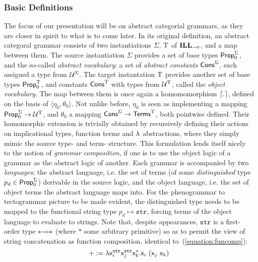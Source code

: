 \subsubsection{Basic Definitions}
The focus of our presentation will be on abstract categorial grammars, as they are closer in spirit to what is to come later.
In its original definition, an abstract categoral grammar consists of two instantiations $\Sigma$, $\mathrm{T}$ of $\ILL_{\li}$, and a map between them.
The source instantiation $\Sigma$ provides a set of base types $\mathsf{Prop}_0^{\Sigma}$, and the so-called \textit{abstract vocabulary}: a set of \textit{abstract constants} $\mathsf{Cons}^{\Sigma}$, each assigned a type from $\mathcal{U}^{\Sigma}$.
The target instantation $\mathrm{T}$ provides another set of base types $\mathsf{Prop}_0^{\mathrm{T}}$, and constants $\mathsf{Cons}^{\mathrm{T}}$ with types from $\mathcal{U}^{\mathrm{T}}$, called the \textit{object vocabulary}.
The map between them is once again a homomomorphism $\lceil{.}\rceil$, defined on the basis of $\langle \eta_0, \theta_0\rangle$.
Not unlike before, $\eta_0$ is seen as implementing a mapping $\mathsf{Prop}_0^{\Sigma} \to \mathcal{U}^{\mathrm{T}}$, and $\theta_0$ a mapping $\mathsf{Cons}^{\Sigma}\to \mathsf{Terms}^{\mathrm{T}}$, both pointwise defined.
Their homomorphic extension is trivially obtained by recursively defining their actions on implicational types, function terms and $\mathnormal{\lambda}$ abstractions, where they simply mimic the source type- and term- structure.
This formulation lends itself nicely to the notion of \textit{grammar composition}, if one is to use the object logic of a grammar as the abstract logic of another.
Each grammar is accompanied by two \textit{languages}; the abstract language, i.e. the set of terms (of some \textit{distinguished} type $p_d\in \mathsf{Prop}_0^{\Sigma}$) derivable in the source logic, and the object language, i.e. the set of object terms the abstract language maps into.
For the phenogrammar to tectogrammar picture to be made evident, the distinguished type needs to be mapped to the functional string type $p_{d} \mapsto \mathtt{str}$, forcing terms of the object language to evaluate to strings.
Note that, despite appearances, $\mathtt{str}$ is a first-order type $*\li *$ (where $*$ some arbitrary primitive) so as to permit the view of string concatenation as function composition, identical to~(\ref{equation:funcomp}):
\begin{equation}
+ := \mathnormal{\lambda} \mathsf{\mathsf{x}_{\mathnormal{i}}^{\mathtt{str}}\mathsf{x}_{\mathnormal{j}}^{\mathtt{str}}\mathsf{x}_{\mathnormal{k}}^{*}.\mathsf{x}_{\mathnormal{i}}~(\mathsf{x}_{\mathnormal{j}}~\mathsf{x}_{\mathnormal{k}})}
\end{equation}


